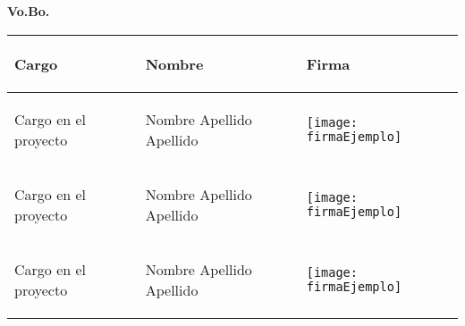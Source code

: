 \begin{Large}
\begin{center}
\textbf{{Vo.Bo.}}
\end{center}
\end{Large}

\begin{center}
\begin{tabu}{ m{4cm} m{4cm} m{4cm}}
\begin{center}
 \textbf{Cargo}
 \end{center} & \begin{center}
 \textbf{Nombre}
 \end{center}  & \begin{center}
 \textbf{Firma}
 \end{center}  \\ 
\hline \hline
\begin{center}
 Cargo en el proyecto
 \end{center} & \begin{center}
 Nombre Apellido Apellido
 \end{center} &  \begin{center}
 \texttt{[image: firmaEjemplo]}
 \end{center} \\
\hline 
\begin{center}
 Cargo en el proyecto
 \end{center} & \begin{center}
 Nombre Apellido Apellido
 \end{center} &  \begin{center}
 \texttt{[image: firmaEjemplo]}
 \end{center} \\
\hline
\begin{center}
 Cargo en el proyecto
 \end{center} & \begin{center}
 Nombre Apellido Apellido
 \end{center} &  \begin{center}
 \texttt{[image: firmaEjemplo]}
 \end{center} \\
\end{tabu}
\end{center}